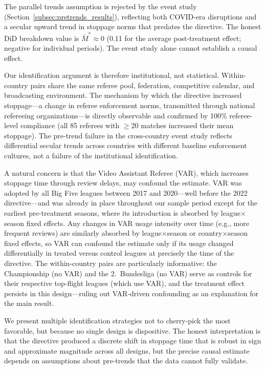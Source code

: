 \documentclass[12pt]{article}
\begin{document}
The parallel trends assumption is rejected by the event study (Section~\ref{subsec:pretrends_results}), reflecting both COVID-era disruptions and a secular upward trend in stoppage norms that predates the directive. The \citet{rambachan2023more} honest DiD breakdown value is $\bar{M}^* \approx 0$ (0.11 for the average post-treatment effect; negative for individual periods). The event study alone cannot establish a causal effect.

Our identification argument is therefore institutional, not statistical. Within-country pairs share the same referee pool, federation, competitive calendar, and broadcasting environment. The mechanism by which the directive increased stoppage---a change in referee enforcement norms, transmitted through national refereeing organizations---is directly observable and confirmed by 100\% referee-level compliance (all 85 referees with $\geq$20 matches increased their mean stoppage). The pre-trend failure in the cross-country event study reflects differential secular trends across countries with different baseline enforcement cultures, not a failure of the institutional identification.

A natural concern is that the Video Assistant Referee (VAR), which increases stoppage time through review delays, may confound the estimate. VAR was adopted by all Big Five leagues between 2017 and 2020---well before the 2022 directive---and was already in place throughout our sample period except for the earliest pre-treatment seasons, where its introduction is absorbed by league$\times$season fixed effects. Any changes in VAR usage intensity over time (e.g., more frequent reviews) are similarly absorbed by league$\times$season or country$\times$season fixed effects, so VAR can confound the estimate only if its usage changed differentially in treated versus control leagues at precisely the time of the directive. The within-country pairs are particularly informative: the Championship (no VAR) and the 2.~Bundesliga (no VAR) serve as controls for their respective top-flight leagues (which use VAR), and the treatment effect persists in this design---ruling out VAR-driven confounding as an explanation for the main result.

We present multiple identification strategies not to cherry-pick the most favorable, but because no single design is dispositive. The honest interpretation is that the directive produced a discrete shift in stoppage time that is robust in sign and approximate magnitude across all designs, but the precise causal estimate depends on assumptions about pre-trends that the data cannot fully validate.
\end{document}
